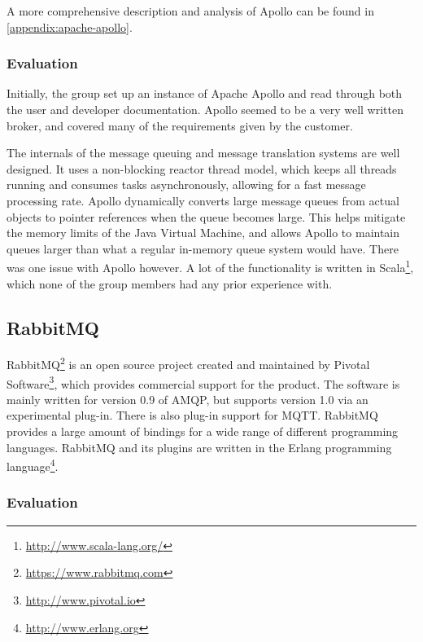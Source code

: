 A more comprehensive description and analysis of Apollo can be found in \ref{appendix:apache-apollo}.

\subsubsection{Evaluation}
\label{subsec:prestudies-existing_solutions-apache_apollo-evaluation}

Initially, the group set up an instance of Apache Apollo and read through both the user and developer documentation. Apollo seemed to be a very well written broker, and covered many of the requirements given by the customer.

The internals of the message queuing and message translation systems are well designed. It uses a non-blocking reactor thread model, which keeps all threads running and consumes tasks asynchronously, allowing for a fast message processing rate. Apollo dynamically converts large message queues from actual objects to pointer references when the queue becomes large. This helps mitigate the memory limits of the Java Virtual Machine, and allows Apollo to maintain queues larger than what a regular in-memory queue system would have. There was one issue with Apollo however. A lot of the functionality is written in Scala\footnote{\url{http://www.scala-lang.org/}}, which none of the group members had any prior experience with.

\subsection{RabbitMQ}
\label{subsec:prestudies-existing_solutions-rabbitmq}

RabbitMQ\footnote{\url{https://www.rabbitmq.com}} is an open source project created and maintained by Pivotal Software\footnote{\url{http://www.pivotal.io}}, which provides commercial support for the product. The software is mainly written for version 0.9 of AMQP, but supports version 1.0 via an experimental plug-in. There is also plug-in support for MQTT. RabbitMQ provides a large amount of bindings for a wide range of different programming languages. RabbitMQ and its plugins are written in the Erlang programming language\footnote{\url{http://www.erlang.org}}.

\subsubsection{Evaluation}
\label{subsec:prestudies-existing_solutions-rabbitmq-evaluation}

